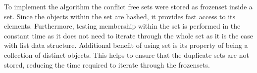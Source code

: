 To implement the algorithm the conflict free sets were stored as frozenset inside a set. Since the objects within the set are hashed, it provides fast access to its elements. Furthermore, testing membership within the set is performed in the constant time as it does not need to iterate through the whole set as it is the case with list data structure. Additional benefit of using set is its property of being a collection of distinct objects. This helps to ensure that the duplicate sets are not stored, reducing the time required to iterate through the frozensets.

